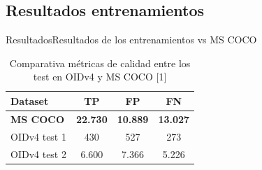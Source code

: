
\subsection{Resultados entrenamientos}

\begin{frame}{Resultados}{Resultados de los entrenamientos vs MS COCO}

\begin{table}[ht]
\centering
\label{tab:comparativa-metricas1}
\begin{tabular}{lccc}
\hline
\textbf{Dataset}                   & \textbf{TP}          & \textbf{FP}          & \textbf{FN}          \\ \hline
\textbf{MS COCO}                   & \textbf{22.730}      & \textbf{10.889}      & \textbf{13.027}      \\
OIDv4 test 1                       & 430                  & 527                  & 273                  \\
OIDv4 test 2                       & 6.600                & 7.366                & 5.226                \\ \hline
\end{tabular}
\caption{Comparativa métricas de calidad entre los test en OIDv4 y MS COCO [1]}
\end{table}


\end{frame}
